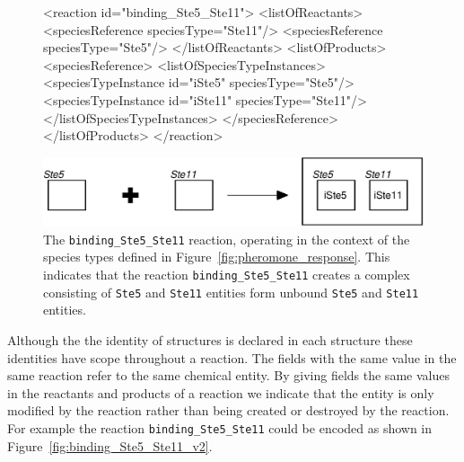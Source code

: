 \documentclass{cekarticle}
\begin{document}
\begin{figure}[h]
\begin{example}
<reaction id="binding_Ste5_Ste11">
    <listOfReactants>
        <speciesReference speciesType="Ste11"/>
        <speciesReference speciesType="Ste5"/>
    </listOfReactants>
    <listOfProducts>
        <speciesReference>
            <listOfSpeciesTypeInstances>
                <speciesTypeInstance id="iSte5" speciesType="Ste5"/>
                <speciesTypeInstance id="iSte11" speciesType="Ste11"/>
            </listOfSpeciesTypeInstances>
        </speciesReference>
    </listOfProducts>
</reaction>
\end{example}
  \vspace*{8pt}
  \centering
  \includegraphics[scale = 0.7]{binding_Ste5_Ste11.eps}
  \caption{The \texttt{binding\_Ste5\_Ste11} reaction, operating in the context of the species types
  defined in Figure~\ref{fig:pheromone_response}.  This indicates that the reaction
  \texttt{binding_Ste5_Ste11} creates a complex consisting of \texttt{Ste5} and \texttt{Ste11} entities
  form unbound \texttt{Ste5} and \texttt{Ste11} entities.}
  \label{fig:binding_Ste5_Ste11}
\end{figure}

Although the the identity of  structures is declared in each
 structure these identities have scope throughout a reaction.
The   fields with the same value in the same reaction refer
to the same chemical entity.  By giving   fields the same values
in the reactants and products of a reaction we indicate that the entity is only modified by the reaction
rather than being created or destroyed by the reaction.  For example the reaction
\texttt{binding\_Ste5\_Ste11} could be encoded as shown in Figure~\ref{fig:binding_Ste5_Ste11_v2}.
\end{document}
